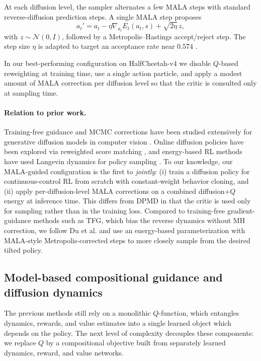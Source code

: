 \documentclass{article}
\theoremstyle{plain}
\theoremstyle{definition}
\theoremstyle{remark}
\begin{document}
At each diffusion level, the sampler alternates a few MALA steps with standard reverse-diffusion prediction steps.
A single MALA step proposes
\begin{equation}
  a_t' = a_t - \eta \nabla_{a_t} E_t(a_t,s) + \sqrt{2\eta}\, z,
\end{equation}
with $z\sim \mathcal{N}(0,I)$, followed by a Metropolis--Hastings accept/reject step.
The step size $\eta$ is adapted to target an acceptance rate near $0.574$ \citep{RobertsTweedie1996MALA}.

In our best-performing configuration on HalfCheetah-v4 we disable $Q$-based reweighting at training time, use a single action particle, and apply a modest amount of MALA correction per diffusion level so that the critic is consulted only at sampling time.

\paragraph{Relation to prior work.}
Training-free guidance and MCMC corrections have been studied extensively for generative diffusion models in computer vision \citep{ye2024tfg,du2023reduce_reuse_recycle}.
Online diffusion policies have been explored via reweighted score matching \citep{ma2025soft}, and energy-based RL methods have used Langevin dynamics for policy sampling \citep{haarnoja2017sql}.
To our knowledge, our MALA-guided configuration is the first to \emph{jointly}: (i) train a diffusion policy for continuous-control RL from scratch with constant-weight behavior cloning, and (ii) apply per-diffusion-level MALA corrections on a combined diffusion+$Q$ energy at inference time.
This differs from DPMD in that the critic is used only for sampling rather than in the training loss. Compared to training-free gradient-guidance methods such as TFG, which bias the reverse dynamics without MH correction, we follow Du et al. \citep{du2023reduce_reuse_recycle} and use an energy-based parameterization with MALA-style Metropolis-corrected steps to more closely sample from the desired tilted policy.

\subsection{Model-based compositional guidance and diffusion dynamics}
\label{sec:mb}

The previous methods still rely on a monolithic $Q$-function, which entangles dynamics, rewards, and value estimates into a single learned object which depends on the policy.
The next level of complexity decouples these components: we replace $Q$ by a compositional objective built from separately learned dynamics, reward, and value networks.
\end{document}
